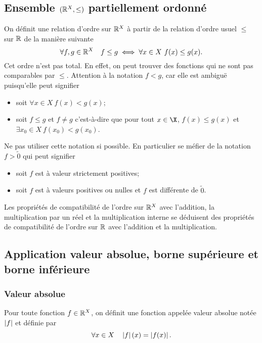\subsection{Ensemble $(\mathbb{R}^X, \leq)$ partiellement ordonné}

On définit une relation d'ordre sur $\mathbb{R}^X$ à partir de la relation d'ordre usuel $\leq$ sur $\mathbb{R}$ de la manière suivante
\begin{equation}
  \forall f,g \in \mathbb{R}^X \quad f \leq g \iff \forall x \in X \ f(x) \leq g(x).
\end{equation}
 Cet ordre n'est pas total. En effet, on peut trouver des fonctions qui ne sont pas comparables par $\leq$. Attention à la notation $f < g$, car elle est ambiguë puisqu'elle peut signifier
 \begin{itemize}
 \item soit $\forall x \in X \ f(x) < g(x)$;
 \item soit $f \leq g$ et $f \neq g$ c'est-à-dire que pour tout $x \in \X$, $f(x) \leq g(x)$ et $\exists x_0 \in X \ f(x_0) < g(x_0)$.
 \end{itemize}
Ne pas utiliser cette notation si possible. En particulier se méfier de la notation $f > \tilde{0}$ qui peut signifier
\begin{itemize}
\item soit $f$ est à valeur strictement positives;
\item soit $f$ est à valeurs positives ou nulles et $f$ est différente de $\tilde{0}$.
\end{itemize}

Les propriétés de compatibilité de l'ordre sur $\mathbb{R}^X$ avec l'addition, la multiplication par un réel et la multiplication interne se déduisent des propriétés de compatibilité de l'ordre sur $\mathbb{R}$ avec l'addition et la multiplication.

\subsection{Application valeur absolue, borne supérieure et borne inférieure}

\subsubsection{Valeur absolue}

\begin{defdef}
  Pour toute fonction $f \in \mathbb{R}^X$, on définit une fonction appelée valeur absolue notée $\left\lvert f\right\rvert$ et définie par
  \begin{equation}
    \forall x \in X \quad \left\lvert f\right\rvert(x)=\left\lvert f(x)\right\rvert.
  \end{equation}
\end{defdef}

